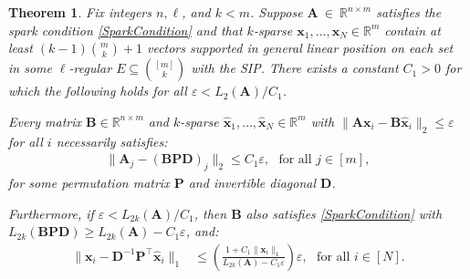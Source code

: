 \documentclass[9pt,twocolumn]{pnas-new}
\newtheorem{theorem}{Theorem}
\begin{document}
\begin{theorem}\label{DeterministicUniquenessTheorem}
Fix integers $n, \ell$, and $k < m$. Suppose $\mathbf{A}~\in~\mathbb{R}^{n \times m}$ satisfies the spark condition \eqref{SparkCondition} and that $k$-sparse \mbox{$\mathbf{x}_1, \ldots, \mathbf{x}_N \in \mathbb{R}^m$} contain at least \mbox{$(k-1){m \choose k}+1$} vectors supported in general linear position on each set in some $\ell$-regular $E \subseteq {[m] \choose k}$ with the SIP.  There exists a constant $C_1 > 0$ for which the following holds for all $\varepsilon < L_2(\mathbf{A}) / C_1$.

Every matrix $\mathbf{B} \in \mathbb{R}^{n \times m}$ and $k$-sparse $\mathbf{\hat x}_1, \ldots, \mathbf{\hat x}_N \in \mathbb{R}^{m}$ with  \mbox{$\|\mathbf{A}\mathbf{x}_i - \mathbf{B}\mathbf{\hat x}_i\|_2 \leq \varepsilon$} for all $i$ necessarily satisfies:
\begin{align}\label{Cstable}
\|\mathbf{A}_j - (\mathbf{B}\mathbf{PD})_j\|_2 \leq C_1 \varepsilon,\ \ \   \text{for all $j \in [m]$},
\end{align}
for some permutation matrix $\mathbf{P}$ and invertible diagonal $\mathbf{D}$.

Furthermore, if $\varepsilon < L_{2k}(\mathbf{A}) / C_1$, then $\mathbf{B}$ also satisfies \eqref{SparkCondition} with $L_{2k}(\mathbf{B}\mathbf{PD}) \geq L_{2k}(\mathbf{A}) - C_1 \varepsilon$, and:
\begin{align}\label{b-PDa}
\|\mathbf{x}_i - \mathbf{D}^{-1}\mathbf{P}^{\top}\mathbf{\hat x}_i\|_1 &\leq  \left( \frac{ 1+C_1 \|\mathbf{x}_i\|_1 }{ L_{2k}(\mathbf{A}) -  C_1\varepsilon } \right) \varepsilon,\ \ \   \text{for all $i \in [N]$}.
\end{align}
\end{theorem}
\end{document}

